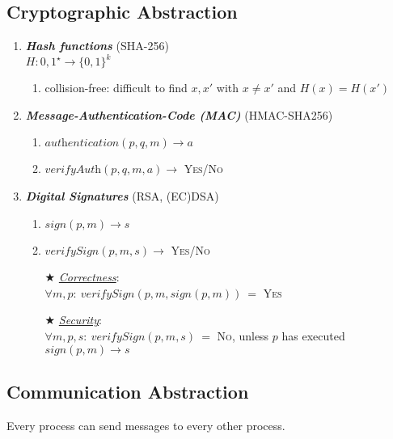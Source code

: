 \documentclass{article}
\begin{document}
\begin{adjustwidth}{2em}{2em}
		\subsection{Cryptographic Abstraction}
		\begin{adjustwidth}{2em}{2em}
			\begin{enumerate}[\footnotesize{\textbullet}]
				\item \textbf{\textit{Hash functions}} (SHA-256) \\
				$H:{ 0,1 } ^{\star} \rightarrow \{ 0,1 \} ^{k}$
				\begin{enumerate}[-]
					\item collision-free: difficult to find $x, x'$ with $x \neq x'$ and $H(x) = H(x')$
				\end{enumerate}
				\item \textbf{\textit{Message-Authentication-Code (MAC)}} (HMAC-SHA256)
				\begin{enumerate}[-]
					\item $\textit{authentication}(p, q, m) \rightarrow a$
					\item $\textit{verifyAuth}(p, q, m, a) \rightarrow$ \textsc{Yes/No}
				\end{enumerate}
				\item \textbf{\textit{Digital Signatures}} (RSA, (EC)DSA)
				\begin{enumerate}[-]
					\item $\textit{sign}(p, m) \rightarrow s$
					\item $\textit{verifySign}(p,m,s) \rightarrow$ \textsc{Yes/No}
					\item[$\bigstar$] \underline{\textit{Correctness}}: \\
					$\forall m,p: \ \textit{verifySign}(p, m, \textit{sign}(p,m)) \ =$ \textsc{Yes}
					\item[$\bigstar$] \underline{\textit{Security}}: \\
					$\forall m, p, s: \ \textit{verifySign}(p, m, s) \ =$ \textsc{No}, unless $p$ has executed $sign(p,m) \rightarrow s$
				\end{enumerate}
			\end{enumerate}
		\end{adjustwidth}
		\subsection{Communication Abstraction}
		\begin{adjustwidth}{2em}{2em}
			Every process can send messages to every other process.

\end{adjustwidth}
\end{adjustwidth}
\end{document}
